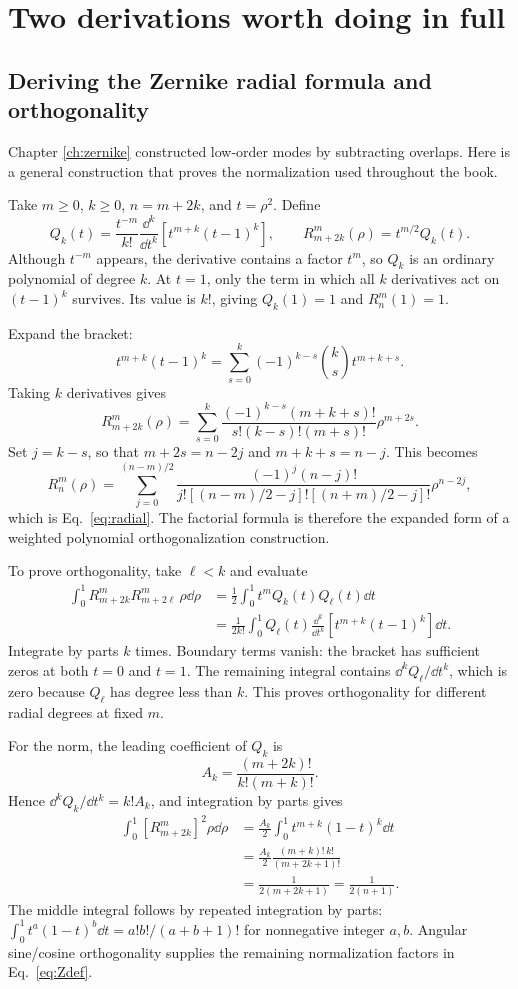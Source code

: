 \chapter{Two derivations worth doing in full}\label{app:derivations}
\section{Deriving the Zernike radial formula and orthogonality}
Chapter \ref{ch:zernike} constructed low-order modes by subtracting
overlaps. Here is a general construction that proves the normalization
used throughout the book.

Take $m\geq0$, $k\geq0$, $n=m+2k$, and $t=\rho^2$.
Define
\begin{equation}
Q_k(t)=\frac{t^{-m}}{k!}
\frac{\dd^k}{\dd t^k}\left[t^{m+k}(t-1)^k\right],
\qquad R_{m+2k}^m(\rho)=t^{m/2}Q_k(t).
\label{eq:rodrigues}
\end{equation}
Although $t^{-m}$ appears, the derivative contains a factor $t^m$,
so $Q_k$ is an ordinary polynomial of degree $k$.
At $t=1$, only the term in which all $k$ derivatives act on
$(t-1)^k$ survives. Its value is $k!$, giving $Q_k(1)=1$
and $R_n^m(1)=1$.

Expand the bracket:
\[
t^{m+k}(t-1)^k
=\sum_{s=0}^k(-1)^{k-s}\binom ks t^{m+k+s}.
\]
Taking $k$ derivatives gives
\[
R_{m+2k}^m(\rho)
=\sum_{s=0}^k
\frac{(-1)^{k-s}(m+k+s)!}
{s!(k-s)!(m+s)!}\rho^{m+2s}.
\]
Set $j=k-s$, so that $m+2s=n-2j$ and $m+k+s=n-j$.
This becomes
\[
R_n^m(\rho)=\sum_{j=0}^{(n-m)/2}
\frac{(-1)^j(n-j)!}
{j![(n-m)/2-j]![(n+m)/2-j]!}\rho^{n-2j},
\]
which is Eq.~\eqref{eq:radial}.
The factorial formula is therefore the expanded form of a weighted
polynomial orthogonalization construction.

To prove orthogonality, take $\ell<k$ and evaluate
\begin{align}
\int_0^1 R_{m+2k}^mR_{m+2\ell}^m\,\rho\dd\rho
&=\frac12\int_0^1t^mQ_k(t)Q_\ell(t)\dd t\\
&=\frac1{2k!}\int_0^1Q_\ell(t)
\frac{\dd^k}{\dd t^k}[t^{m+k}(t-1)^k]\dd t.
\end{align}
Integrate by parts $k$ times. Boundary terms vanish: the bracket has
sufficient zeros at both $t=0$ and $t=1$.
The remaining integral contains $\dd^kQ_\ell/\dd t^k$, which is zero
because $Q_\ell$ has degree less than $k$.
This proves orthogonality for different radial degrees at fixed $m$.

For the norm, the leading coefficient of $Q_k$ is
\[
A_k=\frac{(m+2k)!}{k!(m+k)!}.
\]
Hence $\dd^kQ_k/\dd t^k=k!A_k$, and integration by parts gives
\begin{align}
\int_0^1[R_{m+2k}^m]^2\rho\dd\rho
&=\frac{A_k}{2}\int_0^1t^{m+k}(1-t)^k\dd t\\
&=\frac{A_k}{2}\frac{(m+k)!\,k!}{(m+2k+1)!}\\
&=\frac{1}{2(m+2k+1)}=\frac1{2(n+1)}.
\end{align}
The middle integral follows by repeated integration by parts:
$\int_0^1t^a(1-t)^b\dd t=a!b!/(a+b+1)!$ for nonnegative integer
$a,b$. Angular sine/cosine orthogonality supplies the remaining
normalization factors in Eq.~\eqref{eq:Zdef}.

